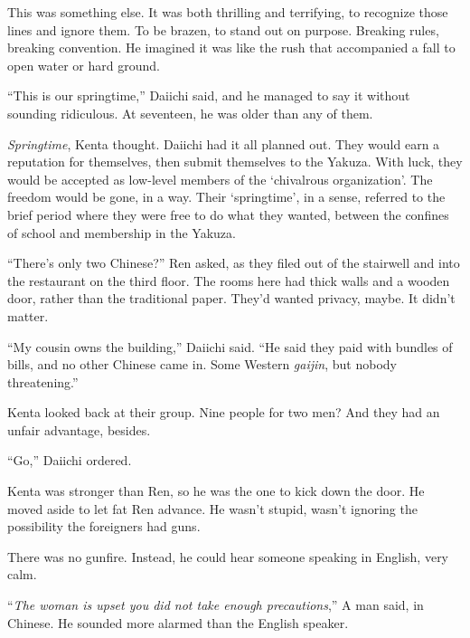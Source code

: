 This was something else.  It was both thrilling and terrifying, to recognize those lines and ignore them.  To be brazen, to stand out on purpose.  Breaking rules, breaking convention.  He imagined it was like the rush that accompanied a fall to open water or hard ground.



``This is our springtime,'' Daiichi said, and he managed to say it without sounding ridiculous.  At seventeen, he was older than any of them.



\emph{Springtime}, Kenta thought.  Daiichi had it all planned out.  They would earn a reputation for themselves, then submit themselves to the Yakuza.  With luck, they would be accepted as low-level members of the `chivalrous organization'.  The freedom would be gone, in a way.  Their `springtime', in a sense, referred to the brief period where they were free to do what they wanted, between the confines of school and membership in the Yakuza.



``There's only two Chinese?'' Ren asked, as they filed out of the stairwell and into the restaurant on the third floor.  The rooms here had thick walls and a wooden door, rather than the traditional paper.  They'd wanted privacy, maybe.  It didn't matter.



``My cousin owns the building,'' Daiichi said. ``He said they paid with bundles of bills, and no other Chinese came in.  Some Western \emph{gaijin}, but nobody threatening.''



Kenta looked back at their group.  Nine people for two men?  And they had an unfair advantage, besides.



``Go,'' Daiichi ordered.



Kenta was stronger than Ren, so he was the one to kick down the door.  He moved aside to let fat Ren advance.  He wasn't stupid, wasn't ignoring the possibility the foreigners had guns.  



There was no gunfire.  Instead, he could hear someone speaking in English, very calm.



``\emph{The woman is upset you did not take enough precautions},'' A man said, in Chinese.  He sounded more alarmed than the English speaker.



